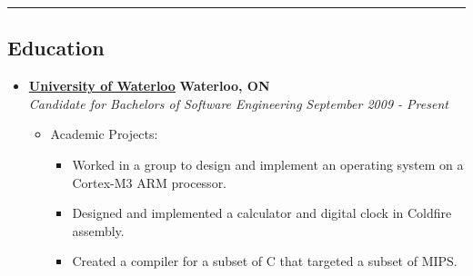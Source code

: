 \documentclass[10pt,letterpaper]{article}
\begin{document}
\hrule
\vspace{-0.4em}
\subsection*{Education}
  \begin{itemize}
    \parskip=-0.1em

    \item[]
    {\href{http://www.uwaterloo.ca}{\textbf{University of Waterloo}} \hfill
      \textbf{Waterloo, ON}}
    \\
    {\emph{Candidate for Bachelors of Software Engineering} \hfill
      \emph{September 2009 - Present}}

    \begin{itemize}[label=\textbullet]
      \item Academic Projects:
      \begin{itemize}
        \itemsep0em
        \item Worked in a group to design and implement an operating system on
              a Cortex-M3 ARM processor.
        \item Designed and implemented a calculator and digital clock in Coldfire
              assembly.
        \item Created a compiler for a subset of C that targeted a subset of
              MIPS.
      \end{itemize}
    \end{itemize}
  \end{itemize}
\end{document}
